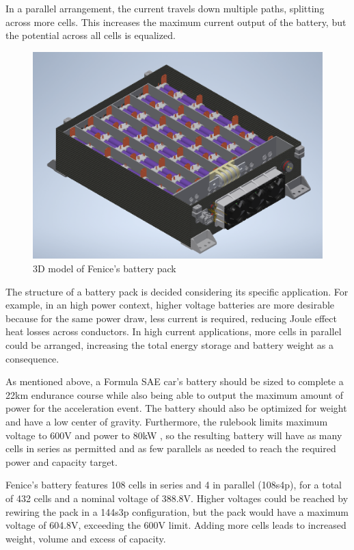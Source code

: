 In a parallel arrangement, the current travels down multiple paths, splitting across more cells. This increases the maximum current output of the battery, but the potential across all cells is equalized.
\begin{figure}[h]
    \centering
    \includegraphics[scale=0.4]{pictures/pack.png}
    \caption{3D model of Fenice's battery pack}
    \label{fig:pack}
\end{figure}
The structure of a battery pack is decided considering its specific application. For example, in an high power context, higher voltage batteries are more desirable because for the same power draw, less current is required, reducing Joule effect heat losses across conductors. In high current applications, more cells in parallel could be arranged, increasing the total energy storage and battery weight as a consequence.

As mentioned above, a Formula SAE car's battery should be sized to complete a 22km endurance course while also being able to output the maximum amount of power for the acceleration event. The battery should also be optimized for weight and have a low center of gravity. Furthermore, the rulebook limits maximum voltage to 600V \cite[EV 4.1.1]{fsg2020} and power to 80kW \cite[EV 2.2.1]{fsg2020}, so the resulting battery will have as many cells in series as permitted and as few parallels as needed to reach the required power and capacity target.

Fenice's battery features 108 cells in series and 4 in parallel (108s4p), for a total of 432 cells and a nominal voltage of 388.8V. Higher voltages could be reached by rewiring the pack in a 144s3p configuration, but the pack would have a maximum voltage of 604.8V, exceeding the 600V limit. Adding more cells leads to increased weight, volume and excess of capacity.

